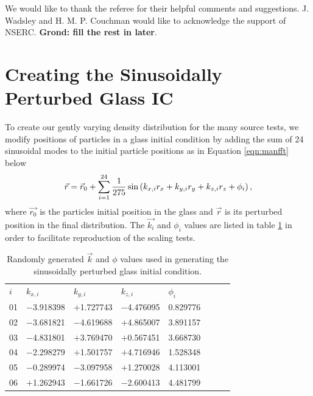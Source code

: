 \documentclass[fleq,usenatbib]{mnras}
\newcommand{\comment}[1]{\textbf{\color{red}#1}}
\begin{document}
{We would like to thank the referee for their helpful comments and suggestions.
J. Wadsley and H. M. P. Couchman would like to acknowledge the support of 
NSERC. \comment{Grond: fill the rest in later}.







\appendix
\section{Creating the Sinusoidally Perturbed Glass IC}
\label{sec:icnd}
To create our gently varying density distribution for the many source tests, 
we modify positions of particles in a glass initial condition by adding the 
sum of 24 sinusoidal modes to the initial particle positions as in Equation 
\ref{eqn:manfft} below
\begin{equation}\label{eqn:manfft}
\vec{r} = \vec{r}_{\rm 0} + \sum_{i=1}^{24} \frac{1}{275} \sin 
\left( k_{x,i} r_x + k_{y,i} r_y + k_{z,i} r_z + \phi_i\right),
\end{equation}
where $\vec{r_0}$ is the particles initial position in the glass and $\vec{r}$ 
is its perturbed position in the final distribution. The $\vec{k_i}$ and 
$\phi_i$ values are listed in table \ref{tab:modes} in order to facilitate reproduction of the scaling tests.  
\begin{table}
	\centering
	\caption{Randomly generated $\vec{k}$ and $\phi$ values used in generating 
             the sinusoidally perturbed glass initial condition.}
	\label{tab:modes}
	\begin{tabular}{llllllll} %
		\hline
		$i$ & $k_{x,i}$ & $k_{y,i}$ & $k_{z,i}$ & $\phi_i$ \\
01 & $-$3.918398 & $+$1.727743 & $-$4.476095 & 0.829776 \\
02 & $-$3.681821 & $-$4.619688 & $+$4.865007 & 3.891157 \\
03 & $-$4.831801 & $+$3.769470 & $+$0.567451 & 3.668730 \\
04 & $-$2.298279 & $+$1.501757 & $+$4.716946 & 1.528348 \\
05 & $-$0.289974 & $-$3.097958 & $+$1.270028 & 4.113001 \\
06 & $+$1.262943 & $-$1.661726 & $-$2.600413 & 4.481799 \\

\end{tabular}
\end{table}}
\end{document}

